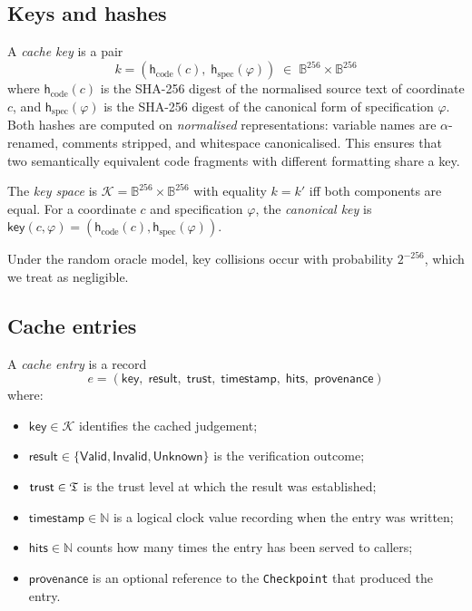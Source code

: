 \documentclass[11pt]{article}
\newcommand{\CacheKey}{\mathsf{key}}               %
\newcommand{\CodeHash}{\mathsf{h}_{\mathrm{code}}} %
\newcommand{\SpecHash}{\mathsf{h}_{\mathrm{spec}}} %
\newcommand{\Valid}{\mathsf{Valid}}                 %
\newcommand{\Invalid}{\mathsf{Invalid}}             %
\newcommand{\Unknown}{\mathsf{Unknown}}             %
\begin{document}
\subsection{Keys and hashes}

A \emph{cache key} is a pair
\[
  k = (\CodeHash(c),\; \SpecHash(\varphi))
  \;\in\; \mathbb{B}^{256} \times \mathbb{B}^{256}
\]
where $\CodeHash(c)$ is the SHA-256 digest of the normalised source
text of coordinate $c$, and $\SpecHash(\varphi)$ is the SHA-256
digest of the canonical form of specification $\varphi$.  Both hashes
are computed on \emph{normalised} representations: variable names are
$\alpha$-renamed, comments stripped, and whitespace canonicalised.
This ensures that two semantically equivalent code fragments with
different formatting share a key.

\begin{definition}\label{def:cache-key}
The \emph{key space} is $\mathcal{K} = \mathbb{B}^{256} \times
\mathbb{B}^{256}$ with equality $k = k'$ iff both components are
equal.  For a coordinate $c$ and specification $\varphi$, the
\emph{canonical key} is $\CacheKey(c,\varphi) =
(\CodeHash(c), \SpecHash(\varphi))$.
\end{definition}

Under the random oracle model, key collisions occur with probability
$2^{-256}$, which we treat as negligible.

\subsection{Cache entries}

\begin{definition}\label{def:cache-entry}
A \emph{cache entry} is a record
\[
  e = (\mathsf{key},\; \mathsf{result},\; \mathsf{trust},\;
       \mathsf{timestamp},\; \mathsf{hits},\; \mathsf{provenance})
\]
where:
\begin{itemize}
\item $\mathsf{key} \in \mathcal{K}$ identifies the cached judgement;
\item $\mathsf{result} \in \{\Valid, \Invalid, \Unknown\}$ is the
  verification outcome;
\item $\mathsf{trust} \in \mathfrak{T}$ is the trust level at which the
  result was established;
\item $\mathsf{timestamp} \in \mathbb{N}$ is a logical clock value
  recording when the entry was written;
\item $\mathsf{hits} \in \mathbb{N}$ counts how many times the entry
  has been served to callers;
\item $\mathsf{provenance}$ is an optional reference to the
  \texttt{Checkpoint} that produced the entry.
\end{itemize}
\end{definition}
\end{document}
